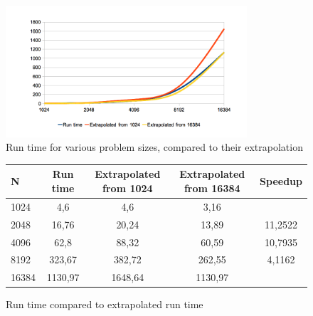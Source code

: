 \begin{figure}[H]
  \centering
    \includegraphics[width=0.8\textwidth]{speed_over_size_3.png}
    \caption{Run time for various problem sizes, compared to their extrapolation}
    \label{runsize}
\end{figure}

\begin{figure}[ht]
    \begin{tabular}{l | c | c | c | c}
        N & Run time & Extrapolated from 1024 & Extrapolated from 16384 & Speedup \\
        \hline
        1024 & 4,6 & 4,6 & 3,16\\
        2048 & 16,76 & 20,24 & 13,89 & 11,2522\\
        4096 & 62,8	 & 88,32 & 60,59 & 10,7935\\
        8192 & 323,67 & 382,72 & 262,55 & 4,1162\\
        16384 & 1130,97 & 1648,64 & 1130,97 \\
        \hline
    \end{tabular}
    \caption{Run time compared to extrapolated run time}
\end{figure}

